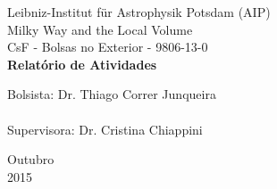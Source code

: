 \documentclass[a4paper, 12pt]{article}
\begin{document}

\begin{titlepage}
	\begin{center}
	

		\Huge{Leibniz-Institut für Astrophysik Potsdam (AIP)}\\
		\large{Milky Way and the Local Volume}\\ 
		\large{CsF - Bolsas no Exterior - 9806-13-0}\\ 
		\vspace{15pt}
        \vspace{95pt}
        \textbf{\LARGE{Relatório de Atividades}}\\
		\vspace{3,5cm}
	\end{center}
	
	\begin{flushleft}
		\begin{tabbing}
			Bolsista: Dr. Thiago Correr Junqueira \\
			 \\
			Supervisora: Dr. Cristina Chiappini\\
	\end{tabbing}
 \end{flushleft}
	\vspace{1cm}
	
	\begin{center}
		\vspace{\fill}
			 Outubro\\
		 2015
			\end{center}
\end{titlepage}

\end{document}
